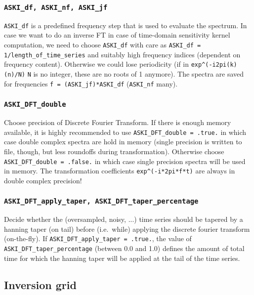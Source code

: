\documentclass[12pt,a4paper]{article}
\newcommand{\lcode}[1]{\nolinkurl{#1}}
\begin{document}
\subsubsection*{\lcode{ASKI_df, ASKI_nf, ASKI_jf}}
\lcode{ASKI_df} is a predefined frequency step that is used to evaluate the spectrum. In case we want to do 
an inverse FT in case of time-domain sensitivity kernel computation, we need to choose \lcode{ASKI_df} with care 
as \lcode{ASKI_df = 1/length_of_time_series} and suitably high frequency indices (dependent on frequency content).
Otherwise we could lose periodicity (if in \lcode{exp^(-i2pi(k)(n)/N)} \lcode{N} is no integer, these are no 
roots of 1 anymore). The spectra are saved for frequencies \lcode{f = (ASKI_jf)*ASKI_df} (\lcode{ASKI_nf} many).
\subsubsection*{\lcode{ASKI_DFT_double}}
Choose precision of Discrete Fourier Transform. If there is enough memory available, it is highly recommended
to use \lcode{ASKI_DFT_double = .true.} in which case double complex spectra are hold in memory (single precision is 
written to file, though, but less roundoffs during transformation). Otherwise choose \lcode{ASKI_DFT_double = .false.}
in which case single precision spectra will be used in memory. The transformation coefficients \lcode{exp^(-i*2pi*f*t)} 
are always in double complex precision!
\subsubsection*{\lcode{ASKI_DFT_apply_taper, ASKI_DFT_taper_percentage}}
Decide whether the (oversampled, noisy, ...) time series should be tapered by a hanning taper (on tail)
before (i.e.\ while) applying the discrete fourier transform (on-the-fly). If \lcode{ASKI_DFT_apply_taper = .true.},
the value of \lcode{ASKI_DFT_taper_percentage} (between 0.0 and 1.0) defines the amount of
total time for which the hanning taper will be applied at the tail of the time series.
\subsection{Inversion grid}
\end{document}
